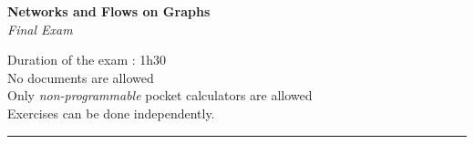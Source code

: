 \documentclass[12pt,a4paper]{article}
\begin{document}
\begin{center}
  
  {\Large \textbf{Networks and Flows on Graphs}}\\

  \vspace{10pt}
  {\Large \textit{Final Exam}}

  \vspace{2\baselineskip}
\end{center}
\begin{center}
\begin{minipage}{\textwidth}
  Duration of the exam : 1h30\\
  No documents are allowed\\
  Only \emph{non-programmable} pocket calculators are allowed\\
  Exercises can be done independently.
\end{minipage}
\end{center}
\rule{\textwidth}{2pt}
\end{document}
